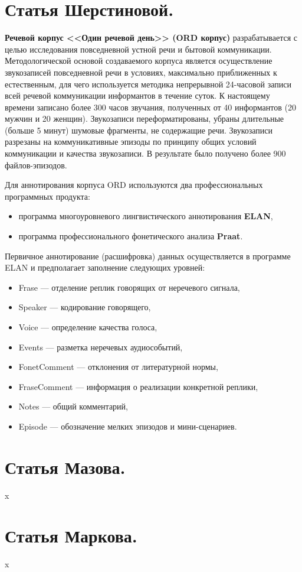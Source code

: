 \documentclass[12pt]{article}
\theoremstyle{definition}
\theoremstyle{remark}
\numberwithin{equation}{section}
\begin{document}
\section{Статья Шерстиновой.}
\textbf{Речевой корпус <<Один речевой день>> (ORD корпус)} разрабатывается с целью исследования повседневной устной речи и бытовой коммуникации. Методологической основой создаваемого корпуса является осуществление звукозаписей повседневной речи в условиях, максимально приближенных к естественным, для чего используется методика непрерывной 24\nobreakdash-часовой записи всей речевой коммуникации информантов в течение суток. К настоящему времени записано более 300 часов звучания, полученных от 40 информантов (20 мужчин и 20 женщин). Звукозаписи переформатированы, убраны длительные (больше 5 минут) шумовые фрагменты, не содержащие речи. Звукозаписи разрезаны на коммуникативные эпизоды по принципу общих условий коммуникации и качества звукозаписи. В результате было получено более 900 файлов-эпизодов.

Для аннотирования корпуса ORD используются два профессиональных программных продукта:
\begin{itemize}
\item программа многоуровневого лингвистического аннотирования \textbf{ELAN},
\item программа профессионального фонетического анализа \textbf{Praat}.
\end{itemize}

Первичное аннотирование (расшифровка) данных осуществляется в программе ELAN и предполагает заполнение следующих уровней:
\begin{itemize}
\item Frase --- отделение реплик говорящих от неречевого сигнала,
\item Speaker --- кодирование говорящего,
\item Voice --- определение качества голоса,
\item Events --- разметка неречевых аудиособытий,
\item FonetComment --- отклонения от литературной нормы,
\item FraseComment --- информация о реализации конкретной реплики,
\item Notes --- общий комментарий,
\item Episode --- обозначение мелких эпизодов и мини\nobreakdash-сценариев.
\end{itemize}


\section{Статья Мазова.}
x
\section{Статья Маркова.}
x
\end{document}
